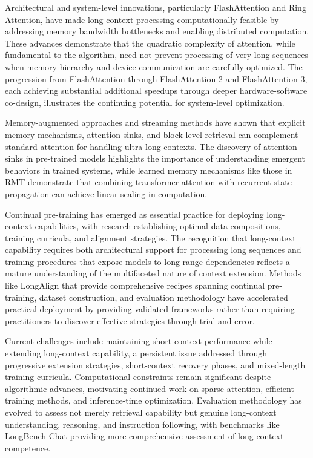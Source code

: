 \documentclass[11pt,letterpaper]{article}
\begin{document}
Architectural and system-level innovations, particularly FlashAttention and Ring Attention, have made long-context processing computationally feasible by addressing memory bandwidth bottlenecks and enabling distributed computation. These advances demonstrate that the quadratic complexity of attention, while fundamental to the algorithm, need not prevent processing of very long sequences when memory hierarchy and device communication are carefully optimized. The progression from FlashAttention through FlashAttention-2 and FlashAttention-3, each achieving substantial additional speedups through deeper hardware-software co-design, illustrates the continuing potential for system-level optimization.

Memory-augmented approaches and streaming methods have shown that explicit memory mechanisms, attention sinks, and block-level retrieval can complement standard attention for handling ultra-long contexts. The discovery of attention sinks in pre-trained models highlights the importance of understanding emergent behaviors in trained systems, while learned memory mechanisms like those in RMT demonstrate that combining transformer attention with recurrent state propagation can achieve linear scaling in computation.

Continual pre-training has emerged as essential practice for deploying long-context capabilities, with research establishing optimal data compositions, training curricula, and alignment strategies. The recognition that long-context capability requires both architectural support for processing long sequences and training procedures that expose models to long-range dependencies reflects a mature understanding of the multifaceted nature of context extension. Methods like LongAlign that provide comprehensive recipes spanning continual pre-training, dataset construction, and evaluation methodology have accelerated practical deployment by providing validated frameworks rather than requiring practitioners to discover effective strategies through trial and error.

Current challenges include maintaining short-context performance while extending long-context capability, a persistent issue addressed through progressive extension strategies, short-context recovery phases, and mixed-length training curricula. Computational constraints remain significant despite algorithmic advances, motivating continued work on sparse attention, efficient training methods, and inference-time optimization. Evaluation methodology has evolved to assess not merely retrieval capability but genuine long-context understanding, reasoning, and instruction following, with benchmarks like LongBench-Chat providing more comprehensive assessment of long-context competence.
\end{document}
